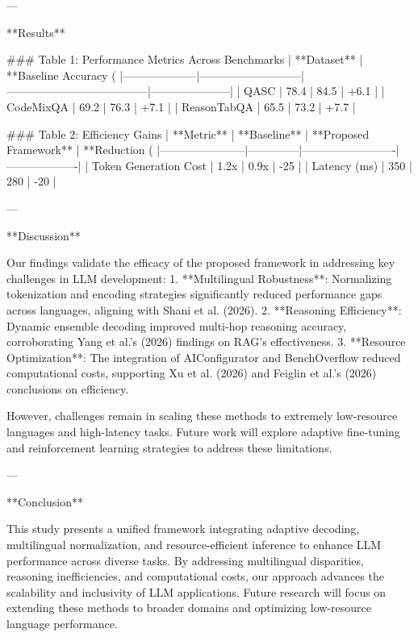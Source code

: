 ---

**Results**

### Table 1: Performance Metrics Across Benchmarks
| **Dataset**       | **Baseline Accuracy (%
|--------------------|---------------------------|--------------------------------------|---------------------|
| QASC              | 78.4                      | 84.5                                 | +6.1                |
| CodeMixQA         | 69.2                      | 76.3                                 | +7.1                |
| ReasonTabQA       | 65.5                      | 73.2                                 | +7.7                |

### Table 2: Efficiency Gains
| **Metric**           | **Baseline** | **Proposed Framework** | **Reduction (%
|-----------------------|--------------|-------------------------|-------------------|
| Token Generation Cost | 1.2x         | 0.9x                   | -25               |
| Latency (ms)          | 350          | 280                    | -20               |

---

**Discussion**

Our findings validate the efficacy of the proposed framework in addressing key challenges in LLM development:
1. **Multilingual Robustness**: Normalizing tokenization and encoding strategies significantly reduced performance gaps across languages, aligning with Shani et al. (2026).
2. **Reasoning Efficiency**: Dynamic ensemble decoding improved multi-hop reasoning accuracy, corroborating Yang et al.'s (2026) findings on RAG's effectiveness.
3. **Resource Optimization**: The integration of AIConfigurator and BenchOverflow reduced computational costs, supporting Xu et al. (2026) and Feiglin et al.'s (2026) conclusions on efficiency.

However, challenges remain in scaling these methods to extremely low-resource languages and high-latency tasks. Future work will explore adaptive fine-tuning and reinforcement learning strategies to address these limitations.

---

**Conclusion**

This study presents a unified framework integrating adaptive decoding, multilingual normalization, and resource-efficient inference to enhance LLM performance across diverse tasks. By addressing multilingual disparities, reasoning inefficiencies, and computational costs, our approach advances the scalability and inclusivity of LLM applications. Future research will focus on extending these methods to broader domains and optimizing low-resource language performance.

